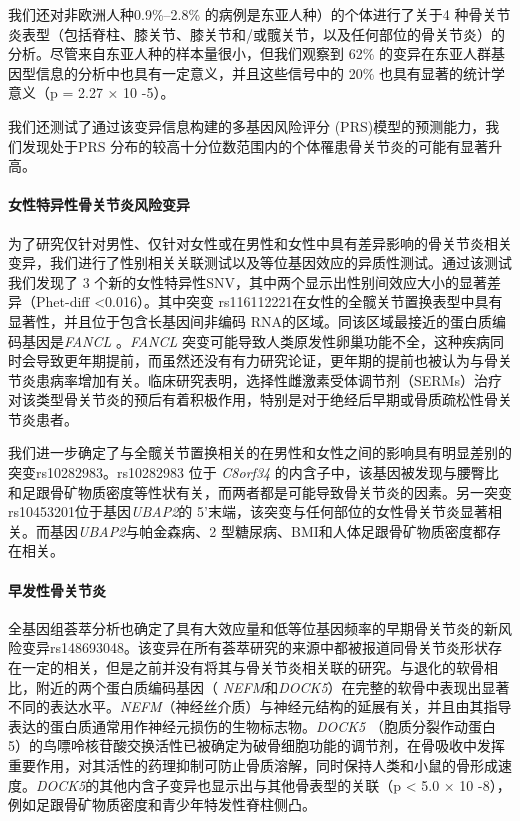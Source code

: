 我们还对非欧洲人种0.9\%--2.8\% 的病例是东亚人种）的个体进行了关于4
种骨关节炎表型（包括脊柱、膝关节、膝关节和/或髋关节，以及任何部位的骨关节炎）的分析。尽管来自东亚人种的样本量很小，但我们观察到
62\% 的变异在东亚人群基因型信息的分析中也具有一定意义，并且这些信号中的
20\% 也具有显著的统计学意义（p = 2.27 × 10 -5）。

我们还测试了通过该变异信息构建的多基因风险评分
(PRS)模型的预测能力，我们发现处于PRS
分布的较高十分位数范围内的个体罹患骨关节炎的可能有显著升高。


\paragraph*{女性特异性骨关节炎风险变异}

为了研究仅针对男性、仅针对女性或在男性和女性中具有差异影响的骨关节炎相关变异，我们进行了性别相关关联测试以及等位基因效应的异质性测试。通过该测试我们发现了
3 个新的女性特异性SNV，其中两个显示出性别间效应大小的显著差异（Phet-diff
\textless0.016）。其中突变
rs116112221在女性的全髋关节置换表型中具有显著性，并且位于包含长基因间非编码
RNA的区域。同该区域最接近的蛋白质编码基因是\emph{FANCL} 。\emph{FANCL}
突变可能导致人类原发性卵巢功能不全，这种疾病同时会导致更年期提前，而虽然还没有有力研究论证，更年期的提前也被认为与骨关节炎患病率增加有关。临床研究表明，选择性雌激素受体调节剂（SERMs）治疗对该类型骨关节炎的预后有着积极作用，特别是对于绝经后早期或骨质疏松性骨关节炎患者。

我们进一步确定了与全髋关节置换相关的在男性和女性之间的影响具有明显差别的突变rs10282983。rs10282983
位于 \emph{C8orf34}
的内含子中，该基因被发现与腰臀比和足跟骨矿物质密度等性状有关，而两者都是可能导致骨关节炎的因素。另一突变rs10453201位于基因\emph{UBAP2}的
5'末端，该突变与任何部位的女性骨关节炎显著相关。而基因\emph{UBAP2}与帕金森病、2
型糖尿病、BMI和人体足跟骨矿物质密度都存在相关。


\paragraph*{早发性骨关节炎}

全基因组荟萃分析也确定了具有大效应量和低等位基因频率的早期骨关节炎的新风险变异rs148693048。该变异在所有荟萃研究的来源中都被报道同骨关节炎形状存在一定的相关，但是之前并没有将其与骨关节炎相关联的研究。与退化的软骨相比，附近的两个蛋白质编码基因（
\emph{
NEFM}和\emph{DOCK5}）在完整的软骨中表现出显著不同的表达水平。\emph{NEFM}（神经丝介质）与神经元结构的延展有关，并且由其指导表达的蛋白质通常用作神经元损伤的生物标志物。\emph{DOCK5}
（胞质分裂作动蛋白
5）的鸟嘌呤核苷酸交换活性已被确定为破骨细胞功能的调节剂，在骨吸收中发挥重要作用，对其活性的药理抑制可防止骨质溶解，同时保持人类和小鼠的骨形成速度。\emph{DOCK5}的其他内含子变异也显示出与其他骨表型的关联（p
\textless{} 5.0 × 10 -8），例如足跟骨矿物质密度和青少年特发性脊柱侧凸。

